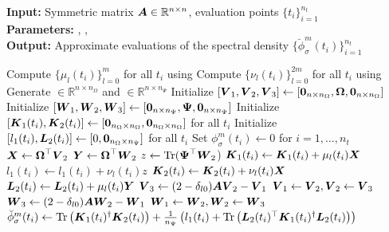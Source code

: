 \hspace*{\algorithmicindent} \textbf{Input:} Symmetric matrix $\boldsymbol{A} \in \mathbb{R}^{n \times n}$, evaluation points $\{t_i\}_{i=1}^{n_t}$ \\
\hspace*{\algorithmicindent} \textbf{Parameters:} , ,  \\
\hspace*{\algorithmicindent} \textbf{Output:} Approximate evaluations of the spectral density $\{\breve{\phi}_{\sigma}^m(t_i)\}_{i=1}^{n_t}$
\begin{algorithmic}[1]
    \State Compute $\{\mu_l(t_i)\}_{l=0}^m$ for all $t_i$ using 
    \State Compute $\{\nu_l(t_i)\}_{l=0}^{2m}$ for all $t_i$ using 
    \State Generate  $\in \mathbb{R}^{n \times n_{\Omega}}$ and  $\in \mathbb{R}^{n \times n_{\Psi}}$
    \State Initialize $[\boldsymbol{V}_1, \boldsymbol{V}_2, \boldsymbol{V}_3] \gets [\boldsymbol{0}_{n \times n_{\Omega}}, \boldsymbol{\boldsymbol{\Omega}}, \boldsymbol{0}_{n \times n_{\Omega}}]$
    \State Initialize $[\boldsymbol{W}_1, \boldsymbol{W}_2, \boldsymbol{W}_3] \gets [\boldsymbol{0}_{n \times n_{\Psi}}, \boldsymbol{\Psi}, \boldsymbol{0}_{n \times n_{\Psi}}]$
    \State Initialize $[\boldsymbol{K}_1(t_i), \boldsymbol{K}_2(t_i)] \gets [\boldsymbol{0}_{n_{\Omega} \times n_{\Omega}}, \boldsymbol{0}_{n_{\Omega} \times n_{\Omega}}]$ for all $t_i$
    \State Initialize $[l_1(t_i), \boldsymbol{L}_2(t_i)] \gets [0, \boldsymbol{0}_{n_{\Omega} \times n_{\Psi}}]$ for all $t_i$
    \State Set ${\phi}_{\sigma}^m(t_i) \gets 0$ for $i=1,\dots,n_t$
      \State $\boldsymbol{X} \gets \boldsymbol{\boldsymbol{\Omega}}^{\top} \boldsymbol{V}_2$
      \State $\boldsymbol{Y} \gets \boldsymbol{\boldsymbol{\Omega}}^{\top} \boldsymbol{W}_2$
      \State $z \gets \operatorname{Tr}(\boldsymbol{\Psi}^{\top} \boldsymbol{W}_2$)
            \State $\boldsymbol{K}_1(t_i) \gets \boldsymbol{K}_1(t_i) + \mu_l(t_i) \boldsymbol{X}$
            \State $l_1(t_i) \gets l_1(t_i) + \nu_l(t_i) z$
        \EndIf
        \State $\boldsymbol{K}_2(t_i) \gets \boldsymbol{K}_2(t_i) + \nu_l(t_i) \boldsymbol{X}$
        \State $\boldsymbol{L}_2(t_i) \gets \boldsymbol{L}_2(t_i) + \mu_l(t_i) \boldsymbol{Y}$
      \EndFor
      \State $\boldsymbol{V}_3 \gets (2 - \delta_{l0}) \boldsymbol{A} \boldsymbol{V}_2 - \boldsymbol{V}_1$ 
      \State $\boldsymbol{V}_1 \gets \boldsymbol{V}_2, \boldsymbol{V}_2 \gets \boldsymbol{V}_3$
      \State $\boldsymbol{W}_3 \gets (2 - \delta_{l0}) \boldsymbol{A} \boldsymbol{W}_2 - \boldsymbol{W}_1$ 
      \State $\boldsymbol{W}_1 \gets \boldsymbol{W}_2, \boldsymbol{W}_2 \gets \boldsymbol{W}_3$
    \EndFor
      \State $\breve{\phi}_{\sigma}^m(t_i) \gets \operatorname{Tr}\left( \boldsymbol{K}_1(t_i)^{\dagger}\boldsymbol{K}_2(t_i) \right) + \frac{1}{n_{\Psi}} \left( l_1(t_i) + \operatorname{Tr}\left( \boldsymbol{L}_2(t_i)^{\top} \boldsymbol{K}_1(t_i)^{\dagger} \boldsymbol{L}_2(t_i) \right)  \right) $
    \EndFor
\end{algorithmic}
